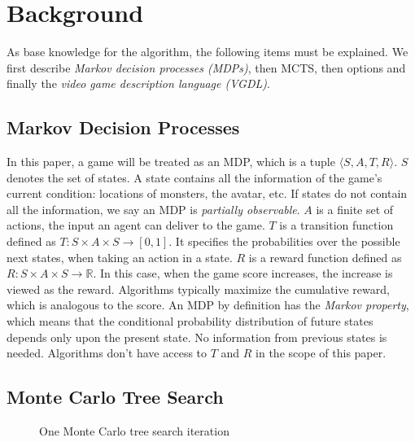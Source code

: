 \section{Background}
\label{sec:background}

As base knowledge for the algorithm, the following items must be explained. We
first describe \emph{Markov decision processes (MDPs)}, then  MCTS, then
options and finally the \emph{video game description language (VGDL)}.

\subsection{Markov Decision Processes}
\label{subsec:mdps}
In this paper, a game will be treated as an MDP, which is a
tuple $\langle S, A, T, R \rangle$. $S$ denotes the set of states. A state
contains all the information of the game's current condition: locations of
monsters, the avatar, etc. If states do not contain all the information, we
say an MDP is \emph{partially observable}. $A$ is a finite set of actions, the
input an agent can deliver to the game. $T$ is a transition function defined as
$T : S \times A \times S \rightarrow \left[0,1\right]$. It specifies the
probabilities over the possible next states, when taking an action in a state.
$R$ is a reward function defined as $R: S \times A \times S \rightarrow
\mathbb{R}$. In this case, when the game score increases, the increase is
viewed as the reward. Algorithms typically maximize the cumulative reward, which
is analogous to the score. An MDP by definition has the \emph{Markov property},
which means that the conditional probability distribution of future states
depends only upon the present state. No information from previous states is
needed. Algorithms don't have access to $T$ and $R$ in the scope of this paper.


\subsection{Monte Carlo Tree Search}
\begin{figure}
	\centering
	\caption{One Monte Carlo tree search iteration}
	\label{fig:mcts}
\end{figure}

